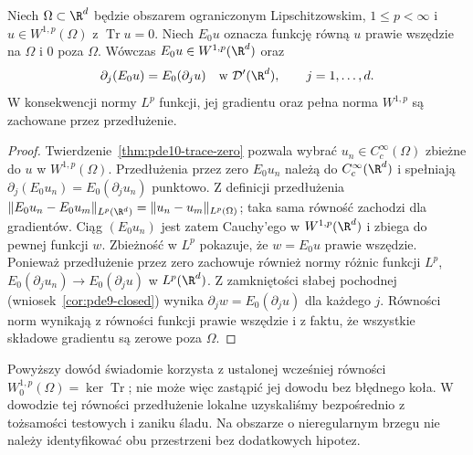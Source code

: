 \begin{wniosek}
\label{cor:pde10-zeroextension}
Niech $\Omega\subset\R^d$ będzie obszarem ograniczonym Lipschitzowskim, $1\le p<\infty$ i
$u\in W^{1,p}(\Omega)$ z $\operatorname{Tr}u=0$.
Niech $E_0u$ oznacza funkcję równą $u$ prawie wszędzie
na $\Omega$ i $0$ poza $\Omega$. Wówczas
$E_0u\in W^{1,p}(\R^d)$ oraz
\[ \partial_j(E_0u)=E_0(\partial_j u)
\quad\text{w }\mathcal D'(\R^d),\qquad j=1,\ldots,d. \]
W konsekwencji normy $L^p$ funkcji, jej gradientu
oraz pełna norma $W^{1,p}$ są zachowane przez
przedłużenie.
\end{wniosek}
\begin{proof}
Twierdzenie~\ref{thm:pde10-trace-zero} pozwala wybrać
$u_n\in C_c^\infty(\Omega)$ zbieżne do $u$ w $W^{1,p}(\Omega)$.
Przedłużenia przez zero $E_0u_n$ należą do
$C_c^\infty(\R^d)$ i spełniają
$\partial_j(E_0u_n)=E_0(\partial_j u_n)$ punktowo.
Z definicji przedłużenia
$\|E_0u_n-E_0u_m\|_{L^p(\R^d)}=
\|u_n-u_m\|_{L^p(\Omega)}$;
taka sama równość zachodzi dla gradientów.
Ciąg $(E_0u_n)$ jest zatem Cauchy'ego w $W^{1,p}(\R^d)$
i zbiega do pewnej funkcji $w$. Zbieżność w $L^p$ pokazuje,
że $w=E_0u$ prawie wszędzie. Ponieważ przedłużenie przez zero zachowuje również
normy różnic funkcji $L^p$,
$E_0(\partial_j u_n)\to E_0(\partial_j u)$ w $L^p(\R^d)$.
Z zamkniętości słabej pochodnej
(wniosek~\ref{cor:pde9-closed}) wynika
$\partial_jw=E_0(\partial_j u)$ dla każdego $j$.
Równości norm wynikają z równości funkcji prawie wszędzie
i z faktu, że wszystkie składowe gradientu są zerowe
poza $\Omega$.
\end{proof}

\begin{uwaga}
Powyższy dowód świadomie korzysta z ustalonej wcześniej
równości $W_0^{1,p}(\Omega)=\ker\operatorname{Tr}$;
nie może więc zastąpić jej dowodu bez błędnego koła.
W dowodzie tej równości przedłużenie lokalne uzyskaliśmy
bezpośrednio z tożsamości testowych i zaniku śladu.
Na obszarze o nieregularnym brzegu nie należy
identyfikować obu przestrzeni bez dodatkowych hipotez.
\end{uwaga}


